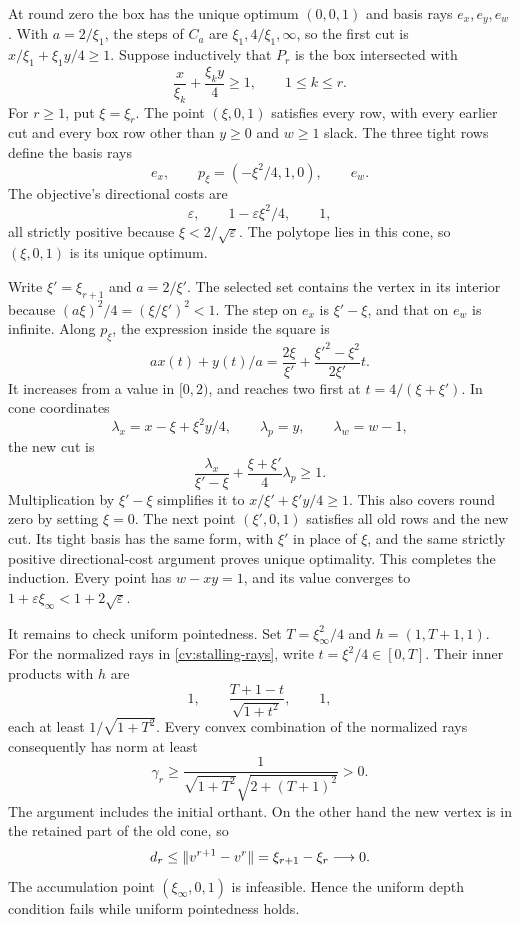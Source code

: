 At round zero the box has the unique optimum $(0,0,1)$ and basis rays
$e_x,e_y,e_w$. With $a=2/\xi_1$, the steps of $C_a$ are
$\xi_1,4/\xi_1,\infty$, so the first cut is
$x/\xi_1+\xi_1y/4\ge1$. Suppose inductively that $P_r$ is the box
intersected with
\begin{equation}\label{cv:successive-halfspaces}
 \frac{x}{\xi_k}+\frac{\xi_ky}{4}\ge1,\qquad 1\le k\le r.
\end{equation}
For $r\ge1$, put $\xi=\xi_r$. The point $(\xi,0,1)$ satisfies every
row, with every earlier cut and every box row other than $y\ge0$ and
$w\ge1$ slack. The three tight rows define the basis rays
\begin{equation}\label{cv:stalling-rays}
 e_x,\qquad p_\xi=(-\xi^2/4,1,0),\qquad e_w.
\end{equation}
The objective's directional costs are
\[
 \varepsilon,\qquad1-\varepsilon\xi^2/4,\qquad1,
\]
all strictly positive because $\xi<2/\sqrt\varepsilon$. The polytope
lies in this cone, so $(\xi,0,1)$ is its unique optimum.

Write $\xi'=\xi_{r+1}$ and $a=2/\xi'$. The selected set contains the
vertex in its interior because $(a\xi)^2/4=(\xi/\xi')^2<1$.
The step on $e_x$ is $\xi'-\xi$, and that on $e_w$ is infinite.
Along $p_\xi$, the expression inside the square is
\[
 ax(t)+y(t)/a
    =\frac{2\xi}{\xi'}+
                       \frac{\xi'^2-\xi^2}{2\xi'}t.
\]
It increases from a value in $[0,2)$, and reaches two first at
$t=4/(\xi+\xi')$. In cone coordinates
\[
 \lambda_x=x-\xi+\xi^2y/4,\qquad
 \lambda_p=y,\qquad\lambda_w=w-1,
\]
the new cut is
\[
 \frac{\lambda_x}{\xi'-\xi}
       +\frac{\xi+\xi'}{4}\lambda_p\ge1.
\]
Multiplication by $\xi'-\xi$ simplifies it to
$x/\xi'+\xi'y/4\ge1$. This also covers round zero by setting
$\xi=0$. The next point $(\xi',0,1)$ satisfies all old rows and the new
cut. Its tight basis has the same form, with $\xi'$ in place of $\xi$,
and the same strictly positive directional-cost argument proves unique
optimality. This completes the induction. Every point has $w-xy=1$, and
its value converges to $1+\varepsilon\xi_\infty<1+2\sqrt\varepsilon$.

It remains to check uniform pointedness. Set
$T=\xi_\infty^2/4$ and $h=(1,T+1,1)$. For the normalized rays in
\cref{cv:stalling-rays}, write $t=\xi^2/4\in[0,T]$. Their inner products
with $h$ are
\[
 1,\qquad\frac{T+1-t}{\sqrt{1+t^2}},\qquad1,
\]
each at least $1/\sqrt{1+T^2}$. Every convex combination of the normalized
rays consequently has norm at least
\begin{equation}\label{cv:stalling-pointedness}
 \gamma_r\ge
       \frac{1}{\sqrt{1+T^2}\sqrt{2+(T+1)^2}}>0.
\end{equation}
The argument includes the initial orthant. On the other hand the new
vertex is in the retained part of the old cone, so
\[
 d_r\le\lVert v^{r+1}-v^r\rVert=\xi_{r+1}-\xi_r\longrightarrow0.
\]
The accumulation point $(\xi_\infty,0,1)$ is infeasible. Hence the
uniform depth condition fails while uniform pointedness holds.

